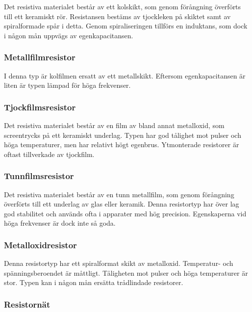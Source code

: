 Det resistiva materialet består av ett kolskikt, som genom förångning överförts
till ett keramiskt rör.
Resistansen bestäms av tjockleken på skiktet samt av spiralformade spår i
detta.
Genom spiraliseringen tillförs en induktans, som dock i någon mån uppvägs av
egenkapacitansen.

\subsubsection{Metallfilmresistor}

I denna typ är kolfilmen ersatt av ett metallskikt.
Eftersom egenkapacitansen är liten är typen lämpad för höga frekvenser.

\subsubsection{Tjockfilmsresistor}

Det resistiva materialet består av en film av bland annat metalloxid, som screentrycks
på ett keramiskt underlag. Typen har god tålighet mot pulser och höga
temperaturer, men har relativt högt egenbrus.
Ytmonterade resistorer är oftast tillverkade av tjockfilm.

\subsubsection{Tunnfilmsresistor}

Det resistiva materialet består av en tunn metallfilm, som genom förångning
överförts till ett underlag av glas eller keramik. Denna resistortyp har över
lag god stabilitet och används ofta i apparater med hög precision.
Egenskaperna vid höga frekvenser är dock inte så goda.

\subsubsection{Metalloxidresistor}

Denna resistortyp har ett spiralformat skikt av metalloxid.
Temperatur- och spänningsberoendet är måttligt.
Tåligheten mot pulser och höga temperaturer är stor.
Typen kan i någon mån ersätta trådlindade resistorer.

\subsubsection{Resistornät}

